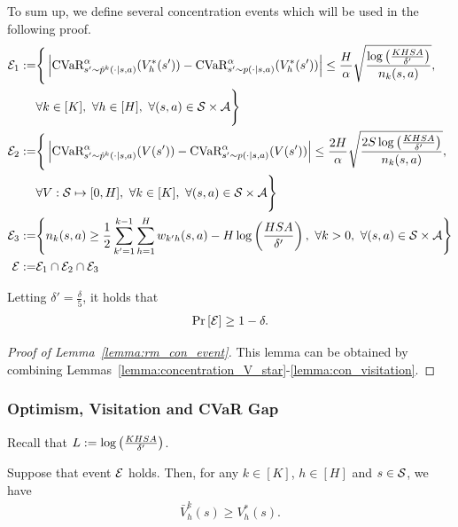To sum up, we define several concentration events which will be used in the following proof.
\begin{align*}
	\mathcal{E}_1:= & \Bigg\{ \left| \textup{CVaR}^{\alpha}_{s' \sim \hat{p}^k(\cdot|s,a)}(V^{*}_h(s')) - \textup{CVaR}^{\alpha}_{s' \sim p(\cdot|s,a)}(V^{*}_h(s')) \right| \leq \frac{H}{\alpha}\sqrt{\frac{ \log \left( \frac{KHSA}{\delta'} \right) }{n_k(s,a)}} ,
	\\ & \forall k \in [K],\ \forall h \in [H],\ \forall (s,a) \in \mathcal{S} \times \mathcal{A} \Bigg\} 
	\\
	\mathcal{E}_2:= & \Bigg\{ \left| \textup{CVaR}^{\alpha}_{s' \sim \hat{p}^k(\cdot|s,a)}(V(s')) - \textup{CVaR}^{\alpha}_{s' \sim p(\cdot|s,a)}(V(s')) \right| \leq \frac{2H}{\alpha}\sqrt{\frac{2S\log \left( \frac{KHSA}{\delta'} \right)}{n_k(s,a)}} ,
	\\ & \forall V: \mathcal{S} \mapsto [0,H],\ \forall k \in [K],\ \forall (s,a) \in \mathcal{S} \times \mathcal{A} \Bigg\} 
	\\
	\mathcal{E}_3:= & \Bigg\{ n_k(s,a) \geq \frac{1}{2} \sum_{k'=1}^{k-1} \sum_{h=1}^{H} w_{k'h}(s,a) - H \log \left( \frac{HSA}{\delta'} \right) ,
	\ \forall k>0,\ \forall (s,a) \in \mathcal{S} \times \mathcal{A}
	\Bigg\} 
	\\
	\mathcal{E}:= & \mathcal{E}_1 \cap \mathcal{E}_2 \cap \mathcal{E}_3 
\end{align*}


\begin{lemma}\label{lemma:rm_con_event}
	Letting $\delta'=\frac{\delta}{5}$, it holds that
	\begin{align*}
		\Pr \left[ \mathcal{E} \right] \geq 1-\delta .
	\end{align*}
\end{lemma}
\begin{proof}[Proof of Lemma~\ref{lemma:rm_con_event}]
	This lemma can be obtained by combining Lemmas~\ref{lemma:concentration_V_star}-\ref{lemma:con_visitation}.
\end{proof}


\subsubsection{Optimism, Visitation and CVaR Gap}

Recall that $L:=\log \left( \frac{KHSA}{\delta'} \right)$.

\begin{lemma}[Optimism] \label{lemma:optimism}
	Suppose that event $\mathcal{E}$ holds. Then,
	for any $k \in [K]$, $h \in [H]$ and $s \in \mathcal{S}$, we have
	\begin{align*}
		\bar{V}^k_h(s) \geq V^{*}_h(s) .
	\end{align*}
\end{lemma}

